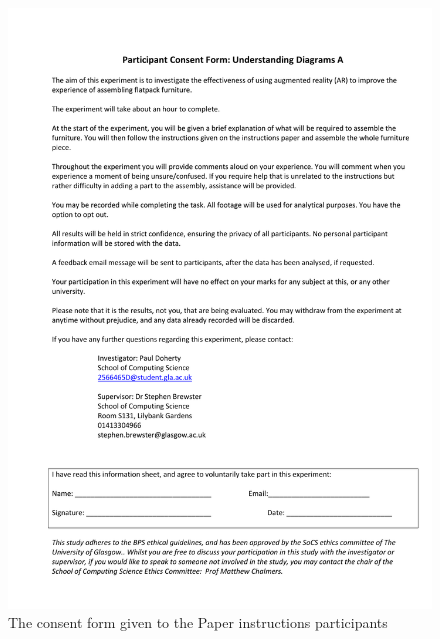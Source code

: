 \documentclass{l4proj}
\begin{document}
\begin{appendices}
\begin{figure}
    \centering
    \includegraphics[width=1\linewidth]{dissertation//images/consentFormPaper.pdf}
    \caption{The consent form given to the Paper instructions participants}
\end{figure}


\end{appendices}
\end{document}
